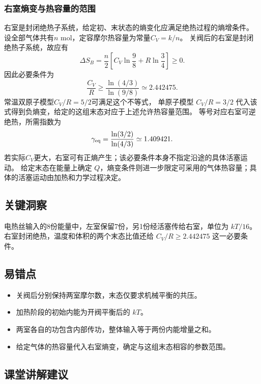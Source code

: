 \documentclass[UTF8,fontset=fandol,a4paper,11pt]{ctexart}
\begin{document}
\subsubsection*{右室熵变与热容量的范围}
右室是封闭绝热子系统，给定初、末状态的熵变化应满足绝热过程的熵增条件。
设全部气体共有$n$ mol，定容摩尔热容量为常量$C_V=k/n$。
关阀后的右室是封闭绝热子系统，故应有
\[
\Delta S_B=\frac n2\left[
C_V\ln\frac98+R\ln\frac34\right]\ge0.
\]
因此必要条件为
\[
\frac{C_V}{R}\ge
\frac{\ln(4/3)}{\ln(9/8)}
\simeq2.442475.
\]
常温双原子模型$C_V/R=5/2$可满足这个不等式，
单原子模型 $C_V/R=3/2$ 代入该式得到负熵变，给定的这组末态对应于上述允许热容量范围。
等号对应右室可逆绝热，所需指数为
\[
\gamma_{\rm eq}=
\frac{\ln(3/2)}{\ln(4/3)}
\simeq1.409421.
\]
若实际$C_V$更大，右室可有正熵产生；该必要条件本身不指定沿途的具体活塞运动。
给定末态在能量上确定 $Q$，熵变条件则进一步限定可采用的气体热容量；具体的活塞运动由加热和力学过程决定。




\subsection*{关键洞察}

电热丝输入的8份能量中，左室保留7份，另1份经活塞传给右室，单位为 $kT/16$。右室封闭绝热，温度和体积的两个末态比值还给 $C_V/R\geq2.442475$ 这一必要条件。



\subsection*{易错点}

\begin{itemize}
\item 关阀后分别保持两室摩尔数，末态仅要求机械平衡的共压。
\item 加热阶段的初始内能为开阀平衡后的 $kT$。
\item 两室各自的功包含内部传功，整体输入等于两份内能增量之和。
\item 给定气体的热容量代入右室熵变，确定与这组末态相容的参数范围。
\end{itemize}



\subsection*{课堂讲解建议}
\end{document}
